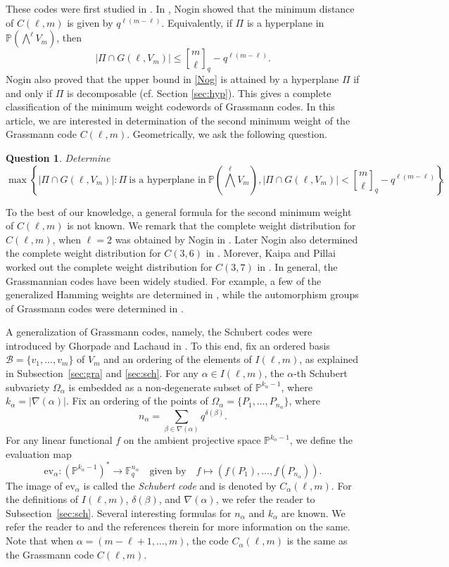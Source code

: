 \documentclass[10pt,a4paper,oneside]{amsproc}
\newtheorem{question}[theorem]{Question}
\newcommand{\B}{\mathcal{B}}
\newcommand{\Fq}{\mathbb{F}_q}
\def\a{{\alpha}}
\def\Fq{{\mathbb F}_q}
\def\PP{{\mathbb P}}
\begin{document}
 These codes were first studied in \cite{R, R1, R2}. In \cite{N}, Nogin showed that the minimum distance of $C(\ell, m)$ is given by $q^{\ell (m - \ell)}$. Equivalently, if $\Pi$ is a hyperplane in $\PP\left(\bigwedge^\ell V_m \right)$, then 
\begin{equation}\label{Nog}
|\Pi \cap G(\ell, V_m)| \le {m \brack \ell}_q - q^{\ell (m - \ell)}.
\end{equation}
Nogin also proved that the upper bound in \eqref{Nog} is attained by a hyperplane $\Pi$ if and only if $\Pi$ is decomposable (cf. Section \ref{sec:hyp}). This gives a complete classification of the minimum weight codewords of Grassmann codes. 
In this article, we are interested in determination of the second minimum weight of the Grassmann code $C(\ell, m)$. Geometrically, we ask the following question.
\begin{question}\label{q1}
   Determine $$\max \left\{|\Pi \cap G(\ell, V_m)| : \Pi \ \text{is a hyperplane in} \ \PP\left(\bigwedge^\ell V_m \right), |\Pi \cap G(\ell, V_m)| < {m \brack \ell}_q - q^{\ell (m - \ell)} \right\}.$$
\end{question}
 
To the best of our knowledge,
a general formula for the second minimum weight of $C(\ell, m)$ is not known. We remark that the complete weight distribution for $C(\ell, m)$, when $\ell = 2$ was obtained by Nogin in \cite{N}. Later Nogin also determined the complete weight distribution for $C(3, 6)$ in \cite{N1}. Morever, Kaipa and Pillai worked out the complete weight distribution for $C(3, 7)$ in \cite{KP}.  In general, the Grassmannian codes have been widely studied. For example, a few of the generalized Hamming weights are determined in \cite{N, GL, GPP, HJR}, while the automorphism groups of Grassmann codes were determined in \cite{GK}.

A generalization of Grassmann codes, namely, the Schubert codes 
were introduced by Ghorpade and Lachaud in \cite{GL}. To this end, 
fix an ordered basis $\B = \{v_1, \dots, v_m\}$ of $V_m$ and an 
ordering of the elements of $I(\ell, m)$, as explained in 
Subsection~\ref{sec:gra} and \ref{sec:sch}. For any $\a \in I(\ell, m)$, the 
$\a$-th Schubert subvariety $\Omega_\a$ is embedded as a 
non-degenerate subset of $\PP^{k_\a - 1}$, where 
$k_\a = |\nabla(\a)|$. Fix an ordering of the points of $\Omega_\a 
= \{P_1, \ldots, P_{n_\a}\}$, where 
$$n_\a = \sum_{\beta \in \nabla(\a)} q^{\delta(\beta)}.$$
For any linear functional $f$ on the ambient projective space 
$\PP^{k_\a - 1}$, we define the evaluation map
$$\mathrm{ev}_\a : (\PP^{k_\a - 1})^* \to \Fq^{n_\a} \quad 
\text{given by} \quad f \mapsto (f(P_1), \ldots, f(P_{n_\a})).$$
The image of $\mathrm{ev}_\a$ is called the \emph{Schubert code} 
and is denoted by $C_\a(\ell, m)$. For the definitions of 
$I(\ell, m)$, $\delta(\beta)$, and $\nabla(\a)$, we refer the 
reader to Subsection~\ref{sec:sch}. Several interesting formulas 
for $n_\a$ and $k_\a$ are known. We refer the reader to \cite{GT} 
and the references therein for more information on the same. Note 
that when $\a = (m-\ell+1, \ldots, m)$, the code $C_\a(\ell, m)$ 
is the same as the Grassmann code $C(\ell, m)$. 
\end{document}
